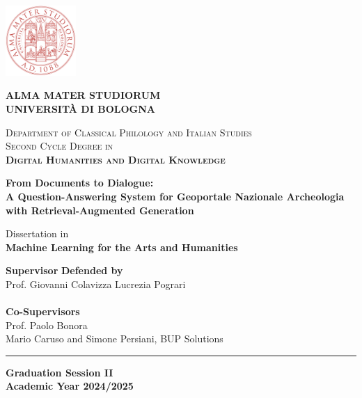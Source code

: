 \documentclass[a4paper,12pt, openany]{book}  %
\begin{document}
\begin{titlepage}
    \centering
    \includegraphics[width=0.2\textwidth]{images/unibo-logo.pdf}
    
    \vspace*{1cm}
    \Large
    \textbf{ALMA MATER STUDIORUM \\ 
    UNIVERSITÀ DI BOLOGNA}
    
    
    \vspace{1.5cm}
    
    \normalsize
    \textsc{Department of Classical Philology and Italian Studies} \\
    \vspace{0.5cm}
    \textsc{Second Cycle Degree in} \\
    \vspace{0.2cm}
    \textsc{\textbf{Digital Humanities and Digital Knowledge}}
    
    \vspace{1.6cm}
    
    \begin{spacing}{1}
    \LARGE
    \textbf{From Documents to Dialogue:\\A Question-Answering System for Geoportale Nazionale Archeologia with Retrieval-Augmented Generation}
    \end{spacing}
    
    \vspace{1.2cm}
    \normalsize
    Dissertation in\\
    \textbf{Machine Learning for the Arts and Humanities}
    
    \vspace{1cm}
    
    \begin{tabbing}
    \textbf{Supervisor} \hspace{10cm} \= \textbf{Defended by} \\
    Prof. Giovanni Colavizza \> Lucrezia Pograri \\
    \\
    \textbf{Co-Supervisors}\\
    Prof. Paolo Bonora \\
    Mario Caruso and Simone Persiani, BUP Solutions
    \end{tabbing}
    
    \vfill
    \rule{\linewidth}{0.4pt}
    \vspace{0.2cm}
    
    \textbf{Graduation Session II} \\
    \textbf{Academic Year 2024/2025}
    
\end{titlepage}
\newpage
\thispagestyle{empty}  %
\mbox{}                %
\setcounter{figure}{0}
\end{document}
